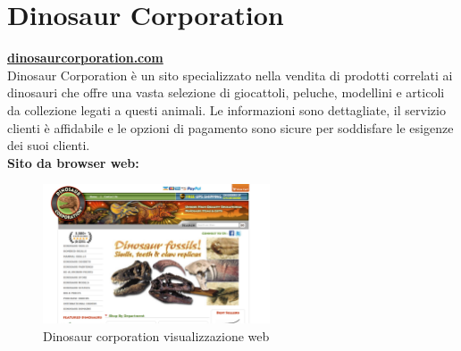 \section{Dinosaur Corporation}
\href{https://www.dinosaurcorporation.com/}{\textbf{dinosaurcorporation.com}}
\\Dinosaur Corporation è un sito specializzato nella vendita di prodotti correlati ai dinosauri che offre una vasta selezione di giocattoli, peluche, modellini e articoli da collezione legati a questi animali. Le informazioni sono dettagliate, il servizio clienti è affidabile e le opzioni di pagamento sono sicure per soddisfare le esigenze dei suoi clienti. 
\\
\textbf{Sito da browser web:}
\begin{figure}[H]
        \centering
        \includegraphics[width=0.60\textwidth]{immagini/dinosaurcorporation.png}
        \caption{Dinosaur corporation visualizzazione web}
    \end{figure}

